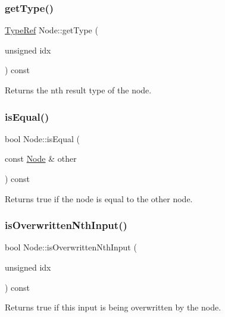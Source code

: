 \subsubsection{\texorpdfstring{get\+Type()}{getType()}}
{\footnotesize\ttfamily \hyperlink{structglow_1_1_type}{Type\+Ref} Node\+::get\+Type (\begin{DoxyParamCaption}\item[{unsigned}]{idx }\end{DoxyParamCaption}) const}

\begin{DoxyReturn}{Returns}
the n\textquotesingle{}th result type of the node. 
\end{DoxyReturn}
\mbox{\label{classglow_1_1_node_aafeb437c040985884ff29c1ccd7946a5}} 
\subsubsection{\texorpdfstring{is\+Equal()}{isEqual()}}
{\footnotesize\ttfamily bool Node\+::is\+Equal (\begin{DoxyParamCaption}\item[{const \hyperlink{classglow_1_1_node}{Node} \&}]{other }\end{DoxyParamCaption}) const}

\begin{DoxyReturn}{Returns}
true if the node is equal to the other node. 
\end{DoxyReturn}
\mbox{\label{classglow_1_1_node_af8d2b902d958cac587be871b69df1bdf}} 
\subsubsection{\texorpdfstring{is\+Overwritten\+Nth\+Input()}{isOverwrittenNthInput()}}
{\footnotesize\ttfamily bool Node\+::is\+Overwritten\+Nth\+Input (\begin{DoxyParamCaption}\item[{unsigned}]{idx }\end{DoxyParamCaption}) const}

\begin{DoxyReturn}{Returns}
true if this input is being overwritten by the node. 
\end{DoxyReturn}
\mbox{\label{classglow_1_1_node_ad4f15015ad48947f9e6d329e94f4a29d}} 

